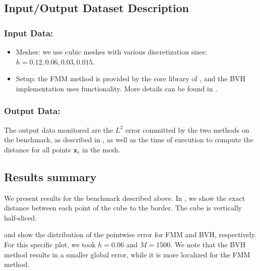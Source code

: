 

\subsection{Input/Output Dataset Description}


\subsubsection{Input Data:}
  \begin{itemize}
  \item Meshes: we use cubic meshes with various discretization sizes: $h = 0.12, 0.06, 0.03, 0.015$.
  \item Setup: the FMM method is provided by the core library of \Feelpp, and the BVH implementation uses \Feelpp functionality.
    More details can be found in \cite{van_landeghem_micro-swimming_2025}.
  \end{itemize}


\subsubsection{Output Data:}

The output data monitored are the $L^2$ error committed by the two methods on the benchmark, as described in ,
as well as the time of execution to compute the distance for all points $\mathbf{x}_i$ in the mesh.



\subsection{Results summary}

We present results for the benchmark described above.
In , we show the exact distance between each point of the cube to the border.
The cube is vertically half-sliced.

 and  show the distribution of the pointwise error for FMM and BVH, respectively.
For this specific plot, we took $h=0.06$ and $M=1500$.
We note that the BVH method results in a smaller global error, while it is more localized for the FMM method.


